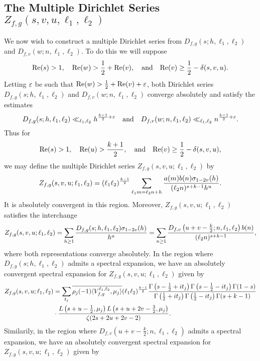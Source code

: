 \documentclass[12pt,reqno,oneside]{amsart}
\begin{document}
  \subsection*{The Multiple Dirichlet Series \texorpdfstring{$Z_{f,g}(s,v,u,\ell_{1},\ell_{2})$}{}}
    We now wish to construct a multiple Dirichlet series from $D_{f,g}(s;h,\ell_{1},\ell_{2})$ and $D_{f,v}(w;n,\ell_{1},\ell_{2})$. To do this we will suppose 
    \[
      \mathrm{Re}(s) > 1, \quad \mathrm{Re}(w) > \frac{1}{2}+\mathrm{Re}(v), \quad \text{and} \quad \mathrm{Re}(v) \ge \frac{1}{2}-\delta(s,v,u).
    \]
    Letting $\varepsilon$ be such that $\mathrm{Re}(w) > \frac{1}{2}+\mathrm{Re}(v)+\varepsilon$, both Dirichlet series $D_{f,g}(s;h,\ell_{1},\ell_{2})$ and $D_{f,v}(w;n,\ell_{1},\ell_{2})$ converge absolutely and satisfy the estimates
    \[
      D_{f,g}(s;h,\ell_{1},\ell_{2}) \ll_{\ell_{1},\ell_{2}} h^{\frac{k-1}{2}+\varepsilon} \quad \text{and} \quad D_{f,v}(w;n,\ell_{1},\ell_{2}) \ll_{\ell_{1},\ell_{2}} n^{\frac{k-1}{2}+\varepsilon}.
    \]
    Thus for
    \[
      \mathrm{Re}(s) > 1, \quad \mathrm{Re}(u) > \frac{k+1}{2}, \quad \text{and} \quad \mathrm{Re}(v) \ge \frac{1}{2}-\delta(s,v,u),
    \]
    we may define the multiple Dirichlet series $Z_{f,g}(s,v,u;\ell_{1},\ell_{2})$ by
    \[
      Z_{f,g}(s,v,u;\ell_{1},\ell_{2}) = (\ell_{1}\ell_{2})^{\frac{k-1}{2}}\sum_{\ell_{1}m = \ell_{2}n+h}\frac{a(m)b(n)\sigma_{1-2v}(h)}{(\ell_{2}n)^{s+k-1}h^{u}}.
    \]
    It is absolutely convergent in this region. Moreover, $Z_{f,g}(s,v,u;\ell_{1},\ell_{2})$ satisfies the interchange
    \[
      Z_{f,g}(s,v,u;\ell_{1},\ell_{2}) = \sum_{h \ge 1}\frac{D_{f,g}(s;h,\ell_{1},\ell_{2})\sigma_{1-2v}(h)}{h^{u}} = \sum_{n \ge 1}\frac{D_{f,v}\left(u+v-\frac{k}{2};n,\ell_{1},\ell_{2}\right)b(n)}{(\ell_{2}n)^{s+k-1}},
    \]
    where both representations converge absolutely. In the region where $D_{f,g}(s;h,\ell_{1},\ell_{2})$ admits a spectral expansion, we have an absolutely convergent spectral expansion for $Z_{f,g}(s,v,u;\ell_{1},\ell_{2})$ given by
    \begin{align*}
      Z_{f,g}(s,v,u;\ell_{1},\ell_{2}) &= \sum_{t_{j}}\overline{\rho_{j}(-1)\langle V_{f,g}^{\ell_{1},\ell_{2}},\mu_{j}\rangle}(\ell_{1}\ell_{2})^{\frac{k-1}{2}}\frac{\Gamma\left(s-\frac{1}{2}+it_{j}\right)\Gamma\left(s-\frac{1}{2}-it_{j}\right)\Gamma(1-s)}{\Gamma\left(\frac{1}{2}+it_{j}\right)\Gamma\left(\frac{1}{2}-it_{j}\right)\Gamma(s+k-1)} \\
      &\cdot \frac{L\left(s+u-\frac{1}{2},\mu_{j}\right)L\left(s+u+2v-\frac{3}{2},\mu_{j}\right)}{\zeta(2s+2u+2v-2)}.
    \end{align*}
    Similarily, in the region where $D_{f,v}\left(u+v-\frac{k}{2};n,\ell_{1},\ell_{2}\right)$ admits a spectral expansion, we have an absolutely convergent spectral expansion for $Z_{f,g}(s,v,u;\ell_{1},\ell_{2})$ given by
\end{document}
